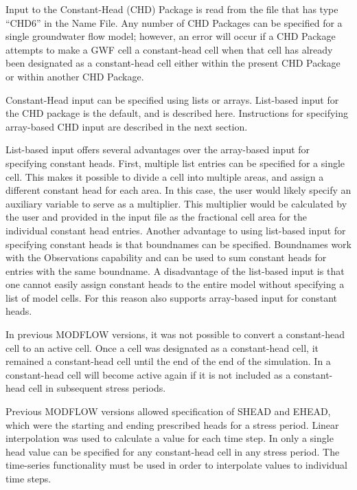 
Input to the Constant-Head (CHD) Package is read from the file that has type ``CHD6'' in the Name File.  Any number of CHD Packages can be specified for a single groundwater flow model; however, an error will occur if a CHD Package attempts to make a GWF cell a constant-head cell when that cell has already been designated as a constant-head cell either within the present CHD Package or within another CHD Package.

Constant-Head input can be specified using lists or arrays.  List-based input for the CHD package is the default, and is described here.  Instructions for specifying array-based CHD input are described in the next section.

List-based input offers several advantages over the array-based input for specifying constant heads.  First, multiple list entries can be specified for a single cell.  This makes it possible to divide a cell into multiple areas, and assign a different constant head for each area.  In this case, the user would likely specify an auxiliary variable to serve as a multiplier.  This multiplier would be calculated by the user and provided in the input file as the fractional cell area for the individual constant head entries.  Another advantage to using list-based input for specifying constant heads is that boundnames can be specified.  Boundnames work with the Observations capability and can be used to sum constant heads for entries with the same boundname.  A disadvantage of the list-based input is that one cannot easily assign constant heads to the entire model without specifying a list of model cells.  For this reason \mf also supports array-based input for constant heads.

In previous MODFLOW versions, it was not possible to convert a constant-head cell to an active cell.  Once a cell was designated as a constant-head cell, it remained a constant-head cell until the end of the end of the simulation.  In \mf a constant-head cell will become active again if it is not included as a constant-head cell in subsequent stress periods.

Previous MODFLOW versions allowed specification of SHEAD and EHEAD, which were the starting and ending prescribed heads for a stress period.  Linear interpolation was used to calculate a value for each time step.  In \mf only a single head value can be specified for any constant-head cell in any stress period.  The time-series functionality must be used in order to interpolate values to individual time steps.  

